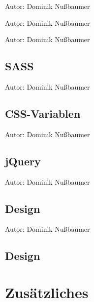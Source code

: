 \documentclass[
    headings=optiontotocandhead,%
    twoside,
    numbers=noenddot,%
    toc=flat, %
    12pt, %
    titlepage, %
    parskip=full, %
    listof=totoc, %
    listof=flat, %
    numbers=noenddot, %
    bibliography=totoc, %
    a4paper,DIV=14,
    BCOR=15mm,
]{scrbook}
\begin{document}
    {Autor: Dominik Nußbaumer}

    {Autor: Dominik Nußbaumer}

    {Autor: Dominik Nußbaumer}

\section{SASS}\label{SASS}

    {Autor: Dominik Nußbaumer}

\section{CSS-Variablen}\label{CSS-Variablen}

    {Autor: Dominik Nußbaumer}

\section{jQuery}\label{jQuery}

    {Autor: Dominik Nußbaumer}

\section{Design}\label{Design}

    {Autor: Dominik Nußbaumer}

\renewcommand{\kapitelautor}{Autor: Dominik Nußbaumer}

% 

\section{Design}\label{Design}

\renewcommand{\kapitelautor}{Autor: Dominik Nußbaumer}

% 

\chapter{Zusätzliches}\label{Zusätzliches}
\end{document}
